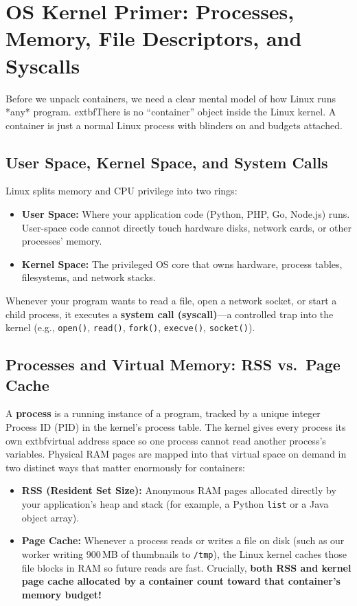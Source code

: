 \section{OS Kernel Primer: Processes, Memory, File Descriptors, and Syscalls}
\label{sec:v3-ch02-kernel-primer}

Before we unpack containers, we need a clear mental model of how Linux runs *any* program. 	extbf{There is no ``container'' object inside the Linux kernel.} A container is just a normal Linux process with blinders on and budgets attached.

\subsection{User Space, Kernel Space, and System Calls}
Linux splits memory and CPU privilege into two rings:
\begin{itemize}[leftmargin=12pt]
  \item \textbf{User Space:} Where your application code (Python, PHP, Go, Node.js) runs. User-space code cannot directly touch hardware disks, network cards, or other processes' memory.
  \item \textbf{Kernel Space:} The privileged OS core that owns hardware, process tables, filesystems, and network stacks.
\end{itemize}
Whenever your program wants to read a file, open a network socket, or start a child process, it executes a \textbf{system call (syscall)}---a controlled trap into the kernel (e.g., \texttt{open()}, \texttt{read()}, \texttt{fork()}, \texttt{execve()}, \texttt{socket()}).

\subsection{Processes and Virtual Memory: RSS vs.\ Page Cache}
A \textbf{process} is a running instance of a program, tracked by a unique integer Process ID (PID) in the kernel's process table. The kernel gives every process its own 	extbf{virtual address space} so one process cannot read another process's variables. Physical RAM pages are mapped into that virtual space on demand in two distinct ways that matter enormously for containers:
\begin{itemize}[leftmargin=12pt]
  \item \textbf{RSS (Resident Set Size):} Anonymous RAM pages allocated directly by your application's heap and stack (for example, a Python \texttt{list} or a Java object array).
  \item \textbf{Page Cache:} Whenever a process reads or writes a file on disk (such as our worker writing 900\,MB of thumbnails to \texttt{/tmp}), the Linux kernel caches those file blocks in RAM so future reads are fast. Crucially, \textbf{both RSS and kernel page cache allocated by a container count toward that container's memory budget!}
\end{itemize}


